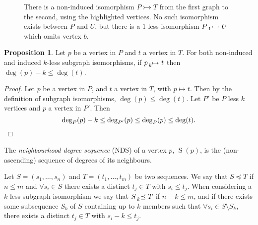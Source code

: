 \documentclass[letterpaper]{article}
\theoremstyle{definition}
\newtheorem{proposition}{Proposition}
\newcommand{\lessnonind}[1]{\prescript{}{#1}{\rightarrowtail}\ }
\newcommand{\lessmap}[1]{\prescript{}{#1}{\mapsto}\ }
\newcommand{\lesspreceq}[1]{\prescript{}{#1}{\preceq}\ }
\newcommand{\nds}{\operatorname{S}}
\begin{document}
\begin{figure}[t]
    \caption{There is a non-induced isomorphism $P\rightarrowtail T$ from the first graph to the
    second, using the highlighted vertices. No such isomorphism exists between $P$ and $U$, but there
    is a $1$-less isomorphism $P\lessnonind{1} U$ which omits vertex $b$.}\label{figure:klessexample}
\end{figure}

\begin{proposition}\label{prop:deg}
    Let $p$ be a vertex in $P$ and $t$ a vertex in $T$. For both non-induced and induced
    $k$-less subgraph isomorphisms, if $p \lessmap{k} t$ then
    $\deg(p) - k \le \deg(t)$.
\end{proposition}
\begin{proof}
Let $p$ be a vertex in $P$, and $t$ a vertex in $T$, with $p\mapsto t$. Then by the definition of subgraph isomorphisms, $\deg(p) \le \deg(t)$. Let $P'$ be $P$ less $k$ vertices and $p$ a vertex in $P'$. Then
\[
\deg_{P}(p)-k \le \deg_{P'}(p) \le \deg_{P}(p) \le \deg(t). \qedhere
\]
\end{proof}

The \emph{neighbourhood degree sequence} (NDS) of a vertex $p$, $\nds(p)$, is the (non-ascending)
sequence of degrees of its neighbours.

Let $S = ( s_1 , \ldots , s_n )$ and $T = ( t_1 , \ldots , t_m)$ be two sequences.  We say that $S
\preceq T$ if $n \leq m$ and $\forall s_i \in S$ there exists a distinct $t_j \in T$ with $s_i \leq
t_j$.  When considering a $k$-less subgraph isomorphism we say that $S \lesspreceq{k} T$ if $n - k
\leq m$, and if there exists some subsequence $S_k$ of $S$ containing up to $k$ members such that
$\forall s_i \in S \setminus S_k$, there exists a distinct $t_j \in T$ with $s_i - k \leq t_j$.
\end{document}
